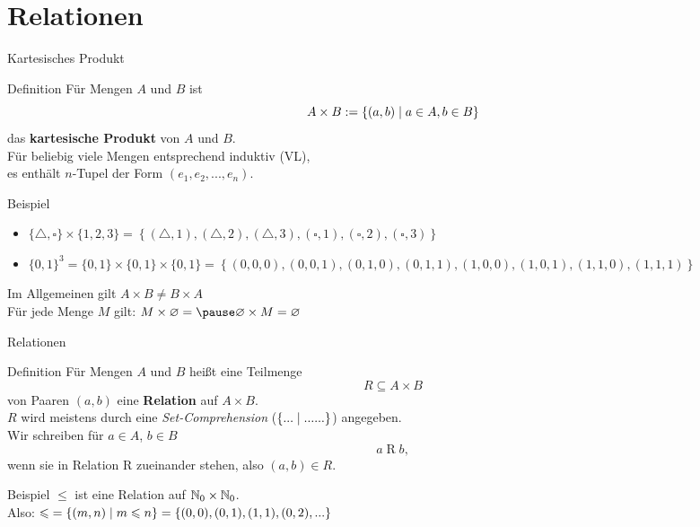 \section{Relationen}

\begin{frame}{Kartesisches Produkt}
	\begin{block}{Definition}
		Für Mengen $A$ und $B$ ist
		$$A \times B := \left\{ (a,b) \;\middle|\; a \in A, b \in B \right\}$$
		das \textbf{kartesische Produkt} von $A$ und $B$. \\
		\impl Für beliebig viele Mengen entsprechend induktiv (VL), \\
		es enthält $n$-Tupel der Form $(e_1, e_2, ..., e_n)$.
	\end{block}

	\pause
	\begin{exampleblock}{Beispiel}
		\begin{itemize}
			\item $\{\triangle,\square\} \times \{1, 2, 3\} = \left\{(\triangle, 1), (\triangle, 2), (\triangle, 3), (\square, 1), (\square, 2), (\square, 3)\right\}$ 
			\item 	$\{0, 1\}^3 = \{0,1\} \times \{0,1\} \times \{0,1\} = \left\{(0, 0, 0), (0, 0, 1), (0, 1, 0), (0, 1, 1), (1, 0, 0), (1, 0, 1), (1, 1, 0), (1, 1, 1)\right\} $
		\end{itemize}
		
		\pause
	   Im Allgemeinen gilt $ A \times B \neq B \times A $\\
	   Für jede Menge $M$ gilt: $ M \times \emptyset = \pause \emptyset \times M = \emptyset$
	\end{exampleblock}
\end{frame}

\begin{frame}{Relationen}
	\begin{block}{Definition}
		Für Mengen $A$ und $B$ heißt eine Teilmenge 
		$$R \subseteq A \times B$$
		von Paaren $(a,b)$ eine \textbf{Relation} auf $A \times B$. \\
		\smallskip
		$R$ wird meistens durch eine \emph{Set-Comprehension} ($\left\{... \vphantom{(} \;\middle|\; ......\right\}$) angegeben. \\
		\smallskip
		Wir schreiben für $a \in A$, $b \in B$ 
		$$a \mathrel{R} b, $$
		wenn sie in Relation R zueinander stehen, also $(a, b) \in R$.
	\end{block}
	
	\pause
	\begin{exampleblock}{Beispiel} 
		$\leq$ ist eine Relation auf $\mathbb{N}_0 \times \mathbb{N}_0 $. \\
		Also: $ \text{$\leqslant$} = \left\{(m, n) \;\middle|\; m \leqslant n \right\} = \{(0, 0), (0, 1), (1, 1), (0, 2), ...\} $
	\end{exampleblock}
\end{frame}

